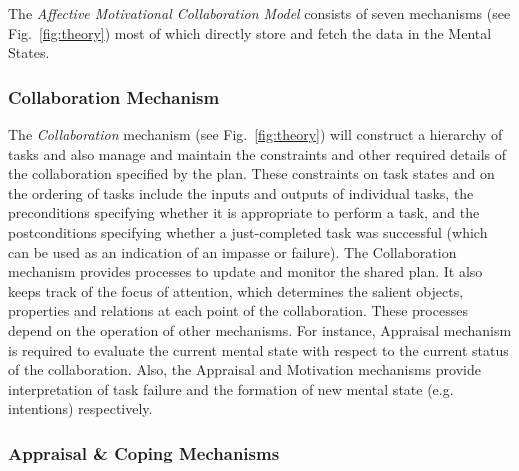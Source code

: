 The \textit{Affective Motivational Collaboration Model} consists of seven
mechanisms (see Fig.~\ref{fig:theory}) most of which directly store and
fetch the data in the Mental States.

\subsubsection{Collaboration Mechanism}
\label{sec:collaboration-mech}

The \textit{Collaboration} mechanism (see Fig.~\ref{fig:theory}) will construct
a hierarchy of tasks and also manage and maintain the constraints and other
required details of the collaboration specified by the plan. These constraints
on task states and on the ordering of tasks include the inputs and outputs of
individual tasks, the preconditions specifying whether it is appropriate to
perform a task, and the postconditions specifying whether a just-completed task
was successful (which can be used as an indication of an impasse or failure).
The Collaboration mechanism provides processes to update and monitor the shared
plan. It also keeps track of the focus of attention, which determines the
salient objects, properties and relations at each point of the collaboration.
These processes depend on the operation of other mechanisms. For instance,
Appraisal mechanism is required to evaluate the current mental state with
respect to the current status of the collaboration. Also, the Appraisal and
Motivation mechanisms provide interpretation of task failure and the formation
of new mental state (e.g.\,intentions) respectively.

\subsubsection{Appraisal \& Coping Mechanisms}
\label{sec:appraisal-coping-mech}

